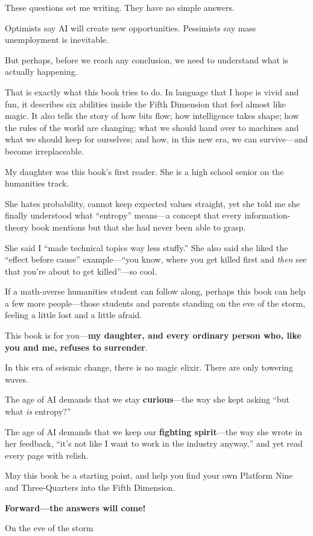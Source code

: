These questions set me writing. They have no simple answers.

Optimists say AI will create new opportunities. Pessimists say mass unemployment is inevitable.

But perhaps, before we reach any conclusion, we need to understand what is actually happening.

\vspace{1em}

That is exactly what this book tries to do.
In language that I hope is vivid and fun, it describes six abilities inside the Fifth Dimension that feel almost like magic. It also tells the story of how bits flow; how intelligence takes shape; how the rules of the world are changing; what we should hand over to machines and what we should keep for ourselves; and how, in this new era, we can survive---and become irreplaceable.

\vspace{1em}

My daughter was this book's first reader. She is a high school senior on the humanities track.

She hates probability, cannot keep expected values straight, yet she told me she finally understood what ``entropy'' means---a concept that every information-theory book mentions but that she had never been able to grasp.

She said I ``made technical topics way less stuffy.'' She also said she liked the ``effect before cause'' example---``you know, where you get killed first and \emph{then} see that you're about to get killed''---so cool.

If a math-averse humanities student can follow along, perhaps this book can help a few more people---those students and parents standing on the eve of the storm, feeling a little lost and a little afraid.

\begin{myquote}
This book is for you---\textbf{my daughter, and every ordinary person who, like you and me, refuses to surrender}.
\end{myquote}

In this era of seismic change, there is no magic elixir. There are only towering waves.

The age of AI demands that we stay \textbf{curious}---the way she kept asking ``but what \emph{is} entropy?''

The age of AI demands that we keep our \textbf{fighting spirit}---the way she wrote in her feedback, ``it's not like I want to work in the industry anyway,'' and yet read every page with relish.

\vspace{1em}

May this book be a starting point, and help you find your own Platform Nine and Three-Quarters into the Fifth Dimension.

\textbf{Forward---the answers will come!}

\vspace{3em}

\hfill \myauthorzh

\hfill On the eve of the storm
